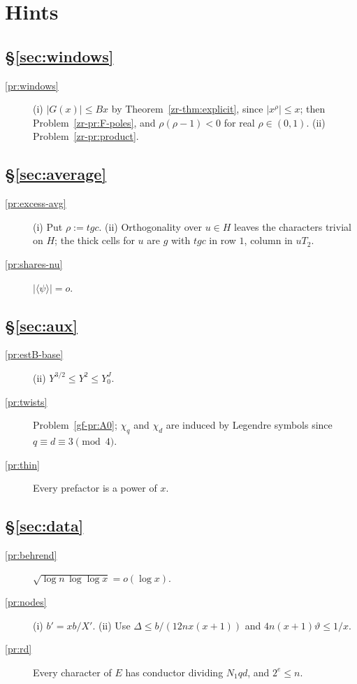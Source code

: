 \documentclass[reqno]{amsart}
\theoremstyle{definition}
\theoremstyle{plain}
\begin{document}
\section*{Hints}

\subsection*{\S\ref{sec:windows}}
\begin{description}
\item[\ref{pr:windows}] (i) \(\lvert G(x)\rvert \le Bx\) by Theorem~\ref{zr-thm:explicit}, since \(\lvert x^\rho\rvert \le x\); then Problem~\ref{zr-pr:F-poles}, and \(\rho(\rho-1) < 0\) for real \(\rho \in (0,1)\).  (ii) Problem~\ref{zr-pr:product}.
\end{description}

\subsection*{\S\ref{sec:average}}
\begin{description}
\item[\ref{pr:excess-avg}] (i) Put \(\rho := tgc\).  (ii) Orthogonality over \(u \in H\) leaves the characters trivial on \(H\); the thick cells for \(u\) are \(g\) with \(tgc\) in row \(1\), column in \(uT_2\).
\item[\ref{pr:shares-nu}] \(\lvert\langle\psi\rangle\rvert = o\).
\end{description}

\subsection*{\S\ref{sec:aux}}
\begin{description}
\item[\ref{pr:estB-base}] (ii) \(Y^{3/2} \le Y^2 \le Y_0^J\).
\item[\ref{pr:twists}] Problem~\ref{gf-pr:A0}; \(\chi_q\) and \(\chi_d\) are induced by Legendre symbols since \(q \equiv d \equiv 3 \pmod 4\).
\item[\ref{pr:thin}] Every prefactor is a power of \(x\).
\end{description}

\subsection*{\S\ref{sec:data}}
\begin{description}
\item[\ref{pr:behrend}] \(\sqrt{\log n\,\log\log x} = o(\log x)\).
\item[\ref{pr:nodes}] (i) \(b' = xb/X'\).  (ii) Use \(\Delta \le b/(12nx(x+1))\) and \(4n(x+1)\vartheta \le 1/x\).
\item[\ref{pr:rd}] Every character of \(E\) has conductor dividing \(N_1qd\), and \(2^e \le n\).
\end{description}
\end{document}
